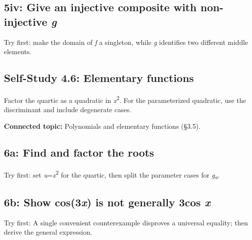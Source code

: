 \documentclass[11pt]{article}
\begin{document}
\begin{keepsection}
\begin{keepsection}
\end{keepsection}

\begin{keepsection}
\subsection{5iv: Give an injective composite with non-injective \textit{g}}

Try first: make the domain of \textit{f} a singleton, while \textit{g} identifies two different middle elements.

\end{keepsection}
\end{keepsection}

\begin{keepsection}
\section{Self-Study 4.6: Elementary functions}

Factor the quartic as a quadratic in \textit{x}\textsuperscript{2}. For the parameterized quadratic, use the discriminant and include degenerate cases.

\textbf{Connected topic:} Polynomials and elementary functions (§3.5).

\begin{keepsection}
\subsection{6a: Find and factor the roots}

Try first: set \textit{u}=\textit{x}\textsuperscript{2} for the quartic, then split the parameter cases for \textit{g}\textsubscript{\textit{a}}.

\end{keepsection}

\begin{keepsection}
\subsection{6b: Show cos(3\textit{x}) is not generally 3cos \textit{x}}

Try first: A single convenient counterexample disproves a universal equality; then derive the general expression.

\end{keepsection}
\end{keepsection}
\end{document}
